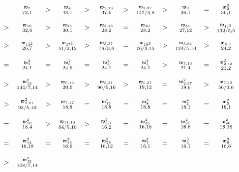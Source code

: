 \documentclass[12pt,twoside,leqno]{article}
\numberwithin{equation}{section}
\newcommand{\w}{\mathfrak w}
\begin{document}
\newcommand {\entree}[2]{\genfrac{}{}{0pt}{1}{#1}{#2}}
\begin {table}[hbt]
\label {tab:comparison}
\caption {Comparison of class invariants: height factor and degree in $J$}
\renewcommand {\arraystretch}{0.7}
\renewcommand {\arraycolsep}{0.3em}
$$
\begin{array}{cccccccccccc}
& \entree{\w_{2}}{72, 1}
&>& \entree{\w_{4}}{48, 1}
&>& \entree{\w_{2, 73}}{37, 6}
&>& \entree{\w_{2, 97}}{147/4, 8}
&>& \entree{\w_{9}}{36, 1}
&=& \entree{\w_{2}^{2}}{36, 1}
\\
\\
>& \entree{\w_{16}}{32, 6}
&>& \entree{\w_{25}}{30, 1}
&>& \entree{\w_{3, 13}}{28, 2}
&=& \entree{\w_{49}}{28, 2}
&>& \entree{\w_{81}}{27, 12}
&>& \entree{\w_{11^{2}}}{132/5, 5}
\\
\\
>& \entree{\w_{13^{2}}}{26, 7}
&>& \entree{\w_{17^{2}}}{51/2, 12}
&>& \entree{\w_{3, 37}}{76/3, 6}
&=& \entree{\w_{19^{2}}}{76/3, 15}
&>& \entree{\w_{3, 61}}{124/5, 10}
&>& \entree{\w_{5, 7}}{24, 2}
\\
\\
=& \entree{\w_{2}^{3}}{24, 1}
&=& \entree{\w_{6}^{2}}{24, 6}
&=& \entree{\w_{4}^{2}}{24, 1}
&=& \entree{\w_{3}^{2}}{24, 1}
&>& \entree{\w_{5, 13}}{21, 4}
&=& \entree{\w_{2, 13}^{2}}{21, 2}
\\
\\
>& \entree{\w_{12}^{2}}{144/7, 14}
&>& \entree{\w_{5, 19}}{20, 6}
&>& \entree{\w_{5, 31}}{96/5, 10}
&>& \entree{\w_{5, 37}}{19, 12}
&=& \entree{\w_{2, 37}^{2}}{19, 6}
&>& \entree{\w_{7, 13}}{56/3, 6}
\\
\\
>& \entree{\w_{2, 61}^{2}}{93/5, 10}
&>& \entree{\w_{7, 17}}{18, 8}
&=& \entree{\w_{15}^{2}}{18, 8}
&=& \entree{\w_{8}^{2}}{18, 8}
&=& \entree{\w_{2}^{4}}{18, 1}
&=& \entree{\w_{5}^{2}}{18, 1}
\\
\\
=& \entree{\w_{10}^{2}}{18, 4}
&>& \entree{\w_{11, 13}}{84/5, 10}
&>& \entree{\w_{3, 7}^{2}}{16, 2}
&=& \entree{\w_{35}^{2}}{16, 18}
&=& \entree{\w_{21}^{2}}{16, 6}
&=& \entree{\w_{40}^{2}}{16, 18}
\\
\\
=& \entree{\w_{14}^{2}}{16, 18}
&=& \entree{\w_{16}^{2}}{16, 6}
&=& \entree{\w_{28}^{2}}{16, 12}
&=& \entree{\w_{7}^{2}}{16, 1}
&=& \entree{\w_{3}^{3}}{16, 1}
&=& \entree{\w_{6}^{3}}{16, 6}
\\
\\
>& \entree{\w_{45}^{2}}{108/7, 14}

\end{array}$$
\end{table}
\end{document}
